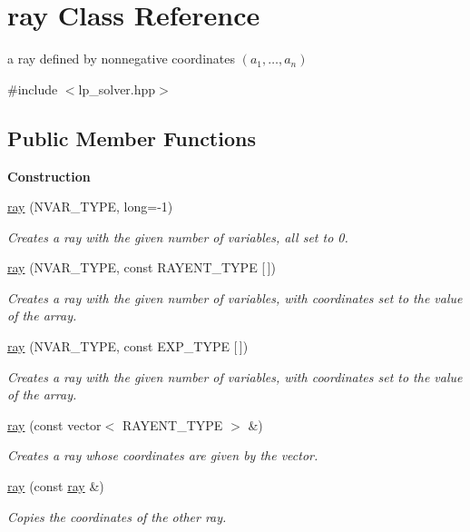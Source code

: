 \hypertarget{classray}{}\section{ray Class Reference}
\label{classray}


a ray defined by nonnegative coordinates $(a_1,\ldots,a_n)$  




{\ttfamily \#include $<$lp\+\_\+solver.\+hpp$>$}

\subsection*{Public Member Functions}
\begin{Indent}\textbf{ Construction}\par
\begin{DoxyCompactItemize}
\item 
\hyperlink{classray_a48d51151bb229b2b3363869760fe4b3c}{ray} (N\+V\+A\+R\+\_\+\+T\+Y\+PE, long=-\/1)
\begin{DoxyCompactList}\small\item\em Creates a ray with the given number of variables, all set to 0. \end{DoxyCompactList}\item 
\hyperlink{classray_a121e66bf83dfa1582edc24505bbc8095}{ray} (N\+V\+A\+R\+\_\+\+T\+Y\+PE, const R\+A\+Y\+E\+N\+T\+\_\+\+T\+Y\+PE \mbox{[}$\,$\mbox{]})
\begin{DoxyCompactList}\small\item\em Creates a ray with the given number of variables, with coordinates set to the value of the array. \end{DoxyCompactList}\item 
\hyperlink{classray_a3639433d20b97abc32b56ca93779dcaf}{ray} (N\+V\+A\+R\+\_\+\+T\+Y\+PE, const E\+X\+P\+\_\+\+T\+Y\+PE \mbox{[}$\,$\mbox{]})
\begin{DoxyCompactList}\small\item\em Creates a ray with the given number of variables, with coordinates set to the value of the array. \end{DoxyCompactList}\item 
\hyperlink{classray_a6387c9c134132709f29770212648c718}{ray} (const vector$<$ R\+A\+Y\+E\+N\+T\+\_\+\+T\+Y\+PE $>$ \&)
\begin{DoxyCompactList}\small\item\em Creates a ray whose coordinates are given by the vector. \end{DoxyCompactList}\item 
\hyperlink{classray_af4ec5bf395f8b37cb7c4fd7f27999a5d}{ray} (const \hyperlink{classray}{ray} \&)
\begin{DoxyCompactList}\small\item\em Copies the coordinates of the other ray. \end{DoxyCompactList}\end{DoxyCompactItemize}
\end{Indent}
